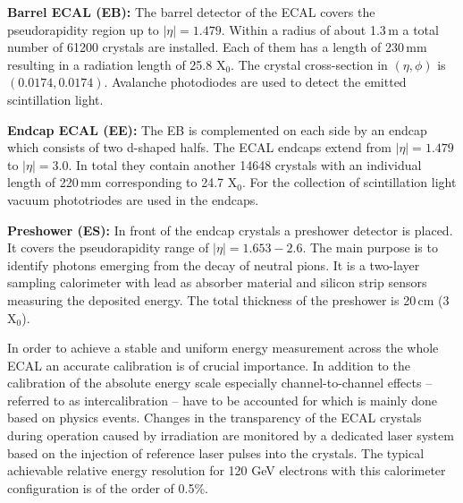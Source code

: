 \begin{description}
 \item \textbf{Barrel ECAL (EB):} The barrel detector of the ECAL covers the pseudorapidity region up to $|\eta| = 1.479$. Within a radius of about 1.3\,m a total number of 61200 crystals are installed. Each of them has a length of 230\,mm resulting in a radiation length of 25.8 $\mathrm{X_0}$. The crystal cross-section in $(\eta, \phi)$ is $(0.0174, 0.0174)$. Avalanche photodiodes are used to detect the emitted scintillation light.
 \item \textbf{Endcap ECAL (EE):} The EB is complemented on each side by an endcap which consists of two d-shaped halfs. The ECAL endcaps extend from $|\eta| = 1.479$ to $|\eta| = 3.0$. In total they contain another 14648 crystals with an individual length of 220\,mm corresponding to 24.7 $\mathrm{X}_0$. For the collection of scintillation light vacuum phototriodes are used in the endcaps.
 \item \textbf{Preshower (ES):} In front of the endcap crystals a preshower detector is placed. It covers the pseudorapidity range of $|\eta| = 1.653 - 2.6$. The main purpose is to identify photons emerging from the decay of neutral pions. It is a two-layer sampling calorimeter with lead as absorber material and silicon strip sensors measuring the deposited energy. The total thickness of the preshower is 20\,cm (3 $\mathrm{X_0}$).
\end{description}
In order to achieve a stable and uniform energy measurement across the whole ECAL an accurate calibration is of crucial importance. In addition to the calibration of the absolute energy scale especially channel-to-channel effects -- referred to as intercalibration -- have to be accounted for which is mainly done based on physics events. Changes in the transparency of the ECAL crystals during operation caused by irradiation are monitored by a dedicated laser system based on the injection of reference laser pulses into the crystals. The typical achievable relative energy resolution for 120 GeV electrons with this calorimeter configuration is of the order of 0.5\%.

